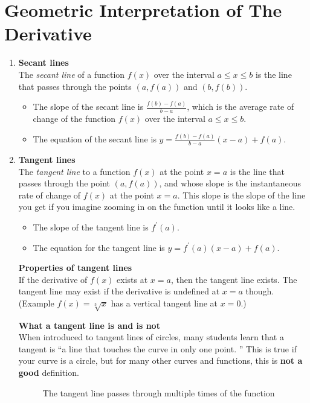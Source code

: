 \section{Geometric Interpretation of The Derivative}
\begin{enumerate}
    \item \textbf{Secant lines}\\
        \indent The \textit{secant line} of a function \(f(x)\) over the interval \(a\leq x\leq b\) is the line that passes through the points \((a,f(a))\) and \((b,f(b))\).
        \begin{itemize}
            \item The slope of the secant line is \(\frac{f(b)-f(a)}{b-a}\), which is the average rate of change of the function \(f(x)\) over the interval \(a\leq x\leq b\).
            \item The equation of the secant line is \(y=\frac{f(b)-f(a)}{b-a}(x-a)+f(a)\).
        \end{itemize}
    \item \textbf{Tangent lines}\\
        \indent The \textit{tangent line} to a function \(f(x)\) at the point \(x=a\) is the line that passes through the point \((a,f(a))\), and whose slope is the instantaneous rate of change of \(f(x)\) at the point \(x=a\). This slope is the slope of the line you get if you imagine zooming in on the function until it looks like a line.
        \begin{itemize}
            \item The slope of the tangent line is \(f^\prime (a)\).
            \item The equation for the tangent line is \(y=f^\prime (a)(x-a)+f(a)\).
        \end{itemize}
        \noindent\textbf{Properties of tangent lines}\\
        If the derivative of \(f(x)\) exists at \(x=a\), then the tangent line exists. The tangent line may exist if the derivative is undefined at \(x=a\) though. (Example \(f(x)=\sqrt[3]{x}\) has a vertical tangent line at \(x=0\).)\par
        \noindent\textbf{What a tangent line is and is not}\\
        When introduced to tangent lines of circles, many students learn that a tangent is ``a line that touches the curve in only one point. '' This is true if your curve is a circle, but for many other curves and functions, this is \textbf{not a good} definition.
        \begin{figure}[H]
            \centering
            \caption{The tangent line passes through multiple times of the function}
        \end{figure}
\end{enumerate}

